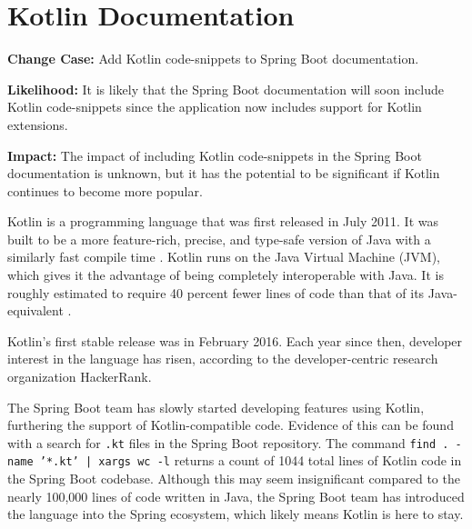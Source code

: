 \section*{Kotlin Documentation}

\begin{textbox}
	\obeylines
	\textbf{Change Case:} Add Kotlin code-snippets to Spring Boot documentation.
    
    \textbf{Likelihood:} It is likely that the Spring Boot documentation will soon include Kotlin code-snippets since the application now includes support for Kotlin extensions.
    
    \textbf{Impact:} The impact of including Kotlin code-snippets in the Spring Boot documentation is unknown, but it has the potential to be significant if Kotlin continues to become more popular.
\end{textbox}

\medskip

Kotlin is a programming language that was first released in July 2011. It was built to be a more feature-rich, precise, and type-safe version of Java with a similarly fast compile time \cite{kotlinwiki:online}. Kotlin runs on the Java Virtual Machine (JVM), which gives it the advantage of being completely interoperable with Java. It is roughly estimated to require 40 percent fewer lines of code than that of its Java-equivalent \cite{kotlinjetbrains:online}.

Kotlin's first stable release was in February 2016. Each year since then, developer interest in the language has risen, according to the developer-centric research organization HackerRank.

The Spring Boot team has slowly started developing features using Kotlin, furthering the support of Kotlin-compatible code. Evidence of this can be found with a search for \texttt{.kt} files in the Spring Boot repository. The command \texttt{find . -name '*.kt' | xargs wc -l} returns a count of 1044 total lines of Kotlin code in the Spring Boot codebase. Although this may seem insignificant compared to the nearly 100,000 lines of code written in Java, the Spring Boot team has introduced the language into the Spring ecosystem, which likely means Kotlin is here to stay.